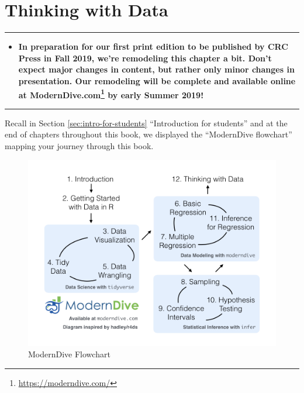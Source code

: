 \documentclass[12pt, krantz2,]{krantz}
\renewcommand{\href}[2]{#2\footnote{\url{#1}}}
\newenvironment{rmdblock}[1]
  {\begin{shaded*}
  \begin{itemize}
  \renewcommand{\labelitemi}{
    \raisebox{-.7\height}[0pt][0pt]{
    }
  }
  \item
  }
  {
  \end{itemize}
  \end{shaded*}
  }
\newenvironment{announcement}
  {\begin{rmdblock}{warning}}
  {\end{rmdblock}}
\begin{document}
\hypertarget{thinking-with-data}{%
\chapter{Thinking with Data}\label{thinking-with-data}}

\begin{center}\rule{0.5\linewidth}{\linethickness}\end{center}

\begin{announcement}
\textbf{In preparation for our first print edition to be published by
CRC Press in Fall 2019, we're remodeling this chapter a bit. Don't
expect major changes in content, but rather only minor changes in
presentation. Our remodeling will be complete and available online at
\href{https://moderndive.com/}{ModernDive.com} by early Summer 2019!}
\end{announcement}

\begin{center}\rule{0.5\linewidth}{\linethickness}\end{center}

Recall in Section \ref{sec:intro-for-students} ``Introduction for students'' and at the end of chapters throughout this book, we displayed the ``ModernDive flowchart'' mapping your journey through this book.

\begin{figure}

{\centering \includegraphics[width=\textwidth]{images/flowcharts/flowchart/flowchart.002} 

}

\caption{ModernDive Flowchart}\label{fig:moderndive-figure-conclusion}
\end{figure}
\end{document}
